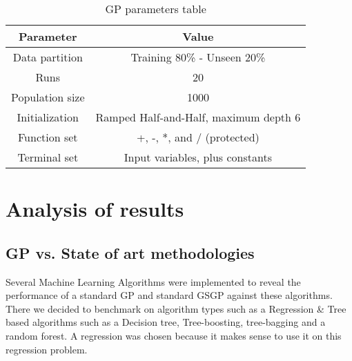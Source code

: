 \documentclass[12pt]{article}
\begin{document}
\begin{table}[h!]
\centering
\begin{tabular}{||c c||}
 \hline
 Parameter & Value    \\ [0.5ex]
 \hline\hline
 Data partition & Training 80\% - Unseen 20\%  \\
 Runs & 20 \\
 Population size & 1000  \\
 Initialization & Ramped Half-and-Half, maximum depth 6 \\
 Function set & +, -, *, and / (protected)\\
 Terminal set & Input variables, plus constants \\
 \hline
\end{tabular}
\label{Table to test captions and labels}
\caption{GP parameters table}
\label{table}
\end{table}


\section*{Analysis of results}
\subsection*{GP vs. State of art methodologies}

Several Machine Learning Algorithms were implemented to reveal the performance of a standard GP and standard GSGP against these algorithms. There we decided to benchmark on algorithm types such as a Regression \& Tree based algorithms such as a Decision tree, Tree-boosting, tree-bagging and a random forest. A regression was chosen because it makes sense to use it on this regression problem.
\end{document}
